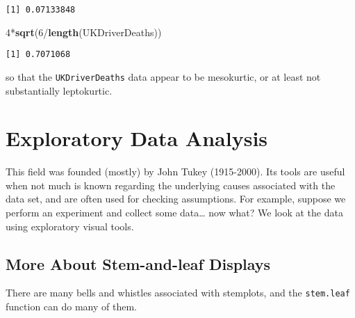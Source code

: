 \documentclass[]{book}
\newenvironment{Shaded}{\begin{snugshade}}{\end{snugshade}}
\newcommand{\KeywordTok}[1]{\textcolor[rgb]{0.13,0.29,0.53}{\textbf{{#1}}}}
\newcommand{\DecValTok}[1]{\textcolor[rgb]{0.00,0.00,0.81}{{#1}}}
\newcommand{\NormalTok}[1]{{#1}}
\numberwithin{equation}{chapter}
\numberwithin{figure}{chapter}
\theoremstyle{plain}
\theoremstyle{definition}
\theoremstyle{remark}
\theoremstyle{definition}
\theoremstyle{definition}
\theoremstyle{remark}
\begin{document}
\begin{verbatim}
[1] 0.07133848
\end{verbatim}

\begin{Shaded}
\begin{Highlighting}[]
\DecValTok{4}\NormalTok{*}\KeywordTok{sqrt}\NormalTok{(}\DecValTok{6}\NormalTok{/}\KeywordTok{length}\NormalTok{(UKDriverDeaths))}
\end{Highlighting}
\end{Shaded}

\begin{verbatim}
[1] 0.7071068
\end{verbatim}

so that the \texttt{UKDriverDeaths} data appear to be mesokurtic, or at
least not substantially leptokurtic.

\section{Exploratory Data Analysis}\label{sec-exploratory-data-analysis}

This field was founded (mostly) by John Tukey (1915-2000). Its tools are
useful when not much is known regarding the underlying causes associated
with the data set, and are often used for checking assumptions. For
example, suppose we perform an experiment and collect some data\ldots{}
now what? We look at the data using exploratory visual tools.

\subsection{More About Stem-and-leaf
Displays}\label{more-about-stem-and-leaf-displays}

There are many bells and whistles associated with stemplots, and the
\texttt{stem.leaf} function can do many of them.
\end{document}
